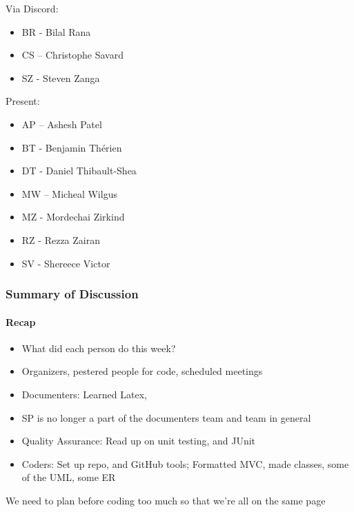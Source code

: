 \documentclass[10pt, a4paper]{article}
\begin{document}
			Via Discord:
			\begin{itemize}
				\item BR - Bilal Rana
				\item CS – Christophe Savard 
				\item SZ - Steven Zanga
			\end{itemize}
			Present: 
			\begin{itemize}
				\item AP – Ashesh Patel
				\item BT - Benjamin Th\'erien
				\item DT - Daniel Thibault-Shea
				\item MW – Micheal Wilgus
				\item MZ - Mordechai Zirkind  
				\item RZ - Rezza Zairan 
				\item SV - Shereece Victor 
				
			\end{itemize}
			
			\subsubsection{Summary of Discussion }
			\paragraph{Recap }
			\begin{itemize}
				\item What did each person do this week?
				\item Organizers, pestered people for code, scheduled meetings 
				\item Documenters: Learned Latex, 
				\item SP is no longer a part of the documenters team and team in general 
				\item Quality Assurance: Read up on unit testing, and JUnit 
				\item Coders: Set up repo, and GitHub tools;	Formatted MVC, made classes, some of the UML, some ER 
				
			\end{itemize}
			We need to plan before coding too much so that we’re all on the same page
			
\end{document}
